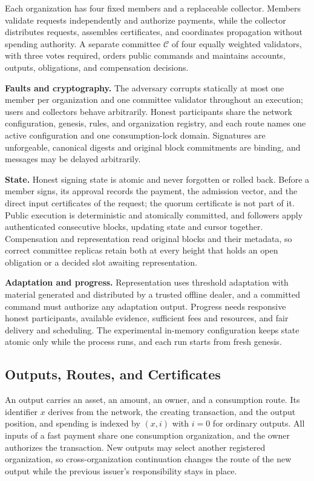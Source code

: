 Each organization has four fixed members and a replaceable collector. Members validate requests independently and authorize payments, while the collector distributes requests, assembles certificates, and coordinates propagation without spending authority. A separate committee $\mathcal C$ of four equally weighted validators, with three votes required, orders public commands and maintains accounts, outputs, obligations, and compensation decisions.

\noindent\textbf{Faults and cryptography.}
The adversary corrupts statically at most one member per organization and one committee validator throughout an execution; users and collectors behave arbitrarily. Honest participants share the network configuration, genesis, rules, and organization registry, and each route names one active configuration and one consumption-lock domain. Signatures are unforgeable, canonical digests and original block commitments are binding, and messages may be delayed arbitrarily.

\noindent\textbf{State.}
Honest signing state is atomic and never forgotten or rolled back. Before a member signs, its approval records the payment, the admission vector, and the direct input certificates of the request; the quorum certificate is not part of it. Public execution is deterministic and atomically committed, and followers apply authenticated consecutive blocks, updating state and cursor together. Compensation and representation read original blocks and their metadata, so correct committee replicas retain both at every height that holds an open obligation or a decided slot awaiting representation.

\noindent\textbf{Adaptation and progress.}
Representation uses threshold adaptation with material generated and distributed by a trusted offline dealer, and a committed command must authorize any adaptation output. Progress needs responsive honest participants, available evidence, sufficient fees and resources, and fair delivery and scheduling. The experimental in-memory configuration keeps state atomic only while the process runs, and each run starts from fresh genesis.

\subsection{Outputs, Routes, and Certificates}
\label{sec:model-certificates}
An output carries an asset, an amount, an owner, and a consumption route. Its identifier $x$ derives from the network, the creating transaction, and the output position, and spending is indexed by $(x,i)$ with $i=0$ for ordinary outputs. All inputs of a fast payment share one consumption organization, and the owner authorizes the transaction. New outputs may select another registered organization, so cross-organization continuation changes the route of the new output while the previous issuer's responsibility stays in place.

